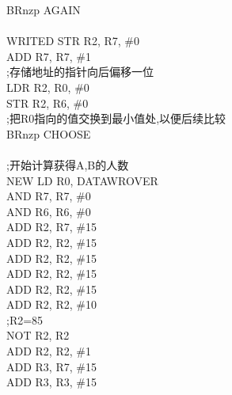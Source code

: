 \documentclass[12pt]{ctexart}
\begin{document}
\hspace*{1.5cm}BRnzp AGAIN\\
\\
WRITED  STR R2, R7, \#0\\
\hspace*{1.5cm}ADD R7, R7, \#1\\
\hspace*{1.5cm};存储地址的指针向后偏移一位\\
\hspace*{1.5cm}LDR R2, R0, \#0\\
\hspace*{1.5cm}STR R2, R6, \#0\\
\hspace*{1.5cm};把R0指向的值交换到最小值处,以便后续比较\\
\hspace*{1.5cm}BRnzp CHOOSE\\
\\
\hspace*{1.5cm};开始计算获得A,B的人数\\
NEW LD R0, DATAWROVER\\
\hspace*{1.5cm}AND R7, R7, \#0\\
\hspace*{1.5cm}AND R6, R6, \#0\\
\hspace*{1.5cm}ADD R2, R7, \#15\\
\hspace*{1.5cm}ADD R2, R2, \#15\\
\hspace*{1.5cm}ADD R2, R2, \#15\\
\hspace*{1.5cm}ADD R2, R2, \#15\\
\hspace*{1.5cm}ADD R2, R2, \#15\\
\hspace*{1.5cm}ADD R2, R2, \#10\\
\hspace*{1.5cm};R2=85\\
\hspace*{1.5cm}NOT R2, R2\\
\hspace*{1.5cm}ADD R2, R2, \#1\\
\hspace*{1.5cm}ADD R3, R7, \#15\\
\hspace*{1.5cm}ADD R3, R3, \#15\\
\end{document}
